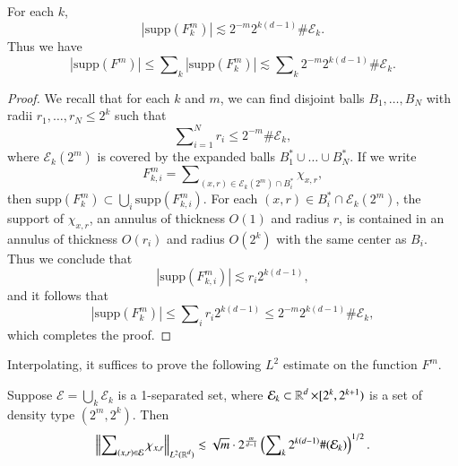 \begin{lemma} \label{lemma5}
    For each $k$,
    \[ |\text{supp}(F^m_k)| \lesssim 2^{-m} 2^{k(d-1)} \# \mathcal{E}_k. \]
    Thus we have
    \[ |\text{supp}(F^m)| \leq \sum\nolimits_k |\text{supp}(F^m_k)| \lesssim \sum\nolimits_k 2^{-m} 2^{k(d-1)} \# \mathcal{E}_k. \]
\end{lemma}
\begin{proof}
    We recall that for each $k$ and $m$, we can find disjoint balls $B_1,\dots,B_N$ with radii $r_1,\dots,r_N \leq 2^k$ such that
    \begin{equation}
      \sum\nolimits_{i = 1}^N r_i \leq 2^{-m} \# \mathcal{E}_k,
    \end{equation}
    where $\mathcal{E}_k(2^m)$ is covered by the expanded balls $B_1^* \cup \dots \cup B_N^*$. If we write
    \begin{equation}
      F^m_{k,i} = \sum\nolimits_{(x,r) \in \mathcal{E}_k(2^m) \cap B_i^*} \chi_{x,r},
    \end{equation}
    then $\text{supp}(F^m_k) \subset \bigcup_i \text{supp}(F^m_{k,i})$. For each $(x,r) \in B_i^* \cap \mathcal{E}_k(2^m)$, the support of $\chi_{x,r}$, an annulus of thickness $O(1)$ and radius $r$, is contained in an annulus of thickness $O(r_i)$ and radius $O(2^k)$ with the same center as $B_i$. Thus we conclude that
    \begin{equation}
      |\text{supp}(F^m_{k,i})| \lesssim r_i 2^{k(d-1)},
    \end{equation}
    and it follows that
    \begin{equation}
      |\text{supp}(F^m_k)| \leq \sum\nolimits_i r_i 2^{k(d-1)} \leq 2^{-m} 2^{k(d-1)} \# \mathcal{E}_k,
    \end{equation}
    which completes the proof.
\end{proof}

Interpolating, it suffices to prove the following $L^2$ estimate on the function $F^m$.

\begin{lemma} \label{lemma6}
    Suppose $\mathcal{E} = \bigcup_k \mathcal{E}_k$ is a 1-separated set, where $\mathcal{E}_k \subset \operatorname{\mathbb{R}}^d \times [2^k,2^{k+1})$ is a set of density type $(2^m, 2^k)$. Then
    \[ \left\| \sum\nolimits_{(x,r) \in \mathcal{E}} \chi_{x,r} \right\|_{L^2(\operatorname{\mathbb{R}}^d)} \lesssim \sqrt{m} \cdot 2^{ \frac{m}{d-1} } \left( \sum\nolimits_k 2^{k(d-1)} \#(\mathcal{E}_k) \right)^{1/2}. \]
\end{lemma}

